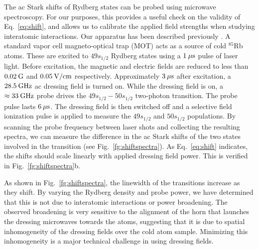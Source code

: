 \documentclass[letterpaper,twocolumn,showpacs,preprintnumbers,amsmath,amssymb,prl,nolongbibliography]{revtex4-2}
\begin{document}
The ac Stark shifts of Rydberg states can be probed using microwave
spectroscopy.  For our purposes,
this provides a useful check on the validity of Eq.~\ref{eq:shift},
and allows us to calibrate the applied field strengths when
studying interatomic interactions.
Our apparatus has been described previously
\cite{afrousheh:2006}.
A standard vapor cell magneto-optical trap
(MOT) acts as a source of cold $^{85}$Rb atoms.
These
are excited to $49s_{1/2}$
Rydberg states using a $1 \: {\rm \mu s}$ pulse of laser light.
Before excitation, the
magnetic and electric fields are reduced to less than $0.02 \: {\rm G}$ and
$0.05 \: {\rm V/cm}$ respectively.  Approximately $3 \: {\rm \mu s}$
after excitation, a $28.5 \: {\rm GHz}$ ac dressing
field is turned on.   While the dressing field is on,
a $\approx 33 \: {\rm GHz}$ probe
drives the $49s_{1/2}-50s_{1/2}$ two-photon transition.
The probe pulse lasts $6 \: {\rm \mu s}$.  The
dressing field is then switched off and a selective field ionization
pulse \cite{gallagher:1994} is applied to measure the
$49s_{1/2}$ and $50s_{1/2}$ populations.
By scanning
the probe frequency between laser shots and collecting the
resulting spectra, we can measure the difference
in the ac Stark shifts of the two states involved
in the transition (see Fig.~\ref{fg:shiftspectra}).
As Eq.~\ref{eq:shift} indicates, the shifts should scale linearly
with applied dressing field power.
This is verified in Fig.~\ref{fg:shiftspectra}b.

As shown in Fig.~\ref{fg:shiftspectra}, the linewidth
of the transitions increase as they shift.  By varying the
Rydberg density and probe power, we have determined that this is not
due to interatomic interactions or power broadening.  The observed
broadening is very sensitive to the alignment of the horn that
launches the dressing microwaves towards the atoms, suggesting
that it is due to spatial inhomogeneity of the dressing fields over
the cold atom sample.  Minimizing this inhomogeneity is a major
technical challenge in using dressing fields.
\end{document}
